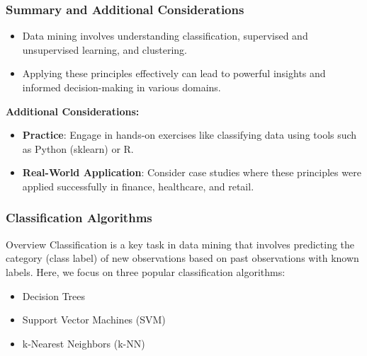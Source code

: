 \documentclass[aspectratio=169]{beamer}
\begin{document}
\begin{frame}[fragile]
    \frametitle{Summary and Additional Considerations}
    \begin{itemize}
        \item Data mining involves understanding classification, supervised and unsupervised learning, and clustering.
        \item Applying these principles effectively can lead to powerful insights and informed decision-making in various domains.
    \end{itemize}

    \textbf{Additional Considerations:}
    \begin{itemize}
        \item \textbf{Practice}: Engage in hands-on exercises like classifying data using tools such as Python (sklearn) or R.
        \item \textbf{Real-World Application}: Consider case studies where these principles were applied successfully in finance, healthcare, and retail.
    \end{itemize}
\end{frame}

\begin{frame}
    \frametitle{Classification Algorithms}
    \begin{block}{Overview}
        Classification is a key task in data mining that involves predicting the category (class label) of new observations based on past observations with known labels. Here, we focus on three popular classification algorithms:
        \begin{itemize}
            \item Decision Trees
            \item Support Vector Machines (SVM)
            \item k-Nearest Neighbors (k-NN)
        \end{itemize}
    \end{block}
\end{frame}
\end{document}
